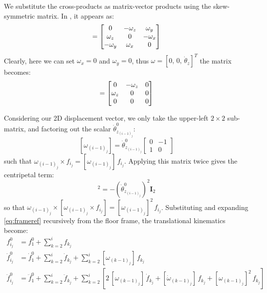 \documentclass[11pt]{article}
\theoremstyle{definition}
\begin{document}
We substitute the cross-products as matrix-vector products using the skew-symmetric matrix. In \cite{Al-Rawashdeh2022_Caracterization}, it appears as:
\begin{equation}
    [\omega]
    =
    \begin{bmatrix}
        0 & -\omega_z & \omega_y \\
        \omega_z & 0 & -\omega_x \\
        -\omega_y & \omega_x & 0
    \end{bmatrix}
    \notag
\end{equation}
Clearly, here we can set $\omega_x = 0$ and $\omega_y = 0$, thus $\omega = [0,\, 0,\, \dot{\theta}_z]^T$ the matrix becomes:
\begin{equation}
    [\omega]
    =
    \begin{bmatrix}
        0 & -\omega_z & 0 \\
        \omega_z & 0 & 0 \\
        0 & 0 & 0
    \end{bmatrix}
    \notag
\end{equation}

Considering our 2D displacement vector, we only take the upper-left $2\times2$ 
sub-matrix, and factoring out the scalar $\dot{\theta}^{0}_{z_{(i-1)_j}}$:
\begin{equation} \label{eq:skew}
    [\omega_{(i-1)_j}] = \dot{\theta}^{0}_{z_{(i-1)_j}}
    \begin{bmatrix} 0 & -1 \\ 1 & 0 \end{bmatrix}
\end{equation}
such that $\omega_{(i-1)_j} \times f_{i_j} = [\omega_{(i-1)_j}]\,f_{i_j}$. 
Applying this matrix twice gives the centripetal term:
\begin{equation}
    [\omega_{(i-1)_j}]^2 = -\left(\dot{\theta}^{0}_{z_{(i-1)_j}}\right)^2 \mathbf{I}_2
\end{equation}
so that $\omega_{(i-1)_j} \times [\omega_{(i-1)_j} \times f_{i_j}] =
[\omega_{(i-1)_j}]^2\,f_{i_j}$. Substituting and expanding
\eqref{eq:frameref} recursively from the floor frame, the translational kinematics become:
\begin{align}
    f^{0}_{i_j}
        &= f^{0}_{1} + \sum^{i}_{k=2} f_{k_j}
        \label{eq:pos_expanded} \\
    \dot{f}^{0}_{i_j}
        &= \dot{f}^{0}_{1} + \sum^{i}_{k=2} \dot{f}_{k_j}
         + \sum^{i}_{k=2} [\omega_{(k-1)_j}]\, f_{k_j}
        \label{eq:vel_expanded} \\
    \ddot{f}^{0}_{i_j}
        &= \ddot{f}^{0}_{1} + \sum^{i}_{k=2} \ddot{f}_{k_j}
         + \sum^{i}_{k=2} \left[
             2\,[\omega_{(k-1)_j}]\,\dot{f}_{k_j}
             + [\dot{\omega}_{(k-1)_j}]\,f_{k_j}
             + [\omega_{(k-1)_j}]^2\,f_{k_j}
         \right]
        \label{eq:acc_expanded}
\end{align}
\end{document}

